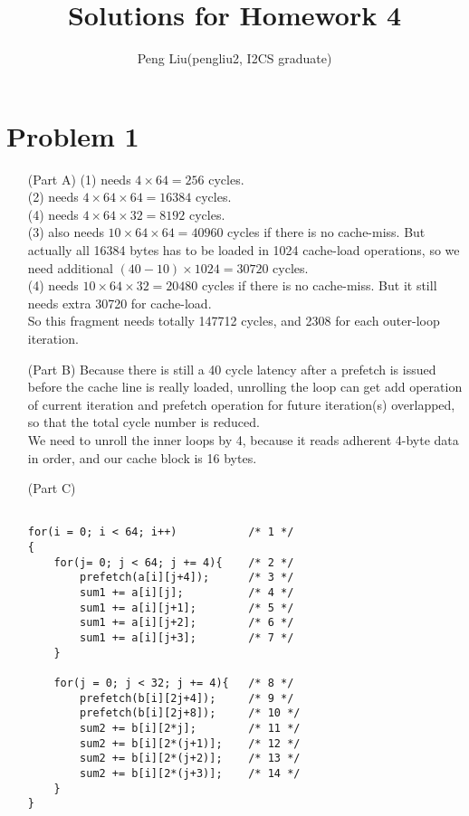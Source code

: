 \documentclass[11pt,leqno]{article}
\author{Peng Liu(pengliu2, I2CS graduate)}
\title{Solutions for Homework 4}
\begin{document}
\lstset{language=C}
\maketitle
\section*{Problem 1}

\begin{enumerate}
\item[(Part A)]
(1) needs $4 \times 64 = 256$ cycles.\\
(2) needs $4 \times 64 \times 64 = 16384$ cycles.\\
(4) needs $4 \times 64 \times 32 = 8192$ cycles.\\
(3) also needs $10 \times 64 \times 64 = 40960$ cycles if there is no cache-miss. But actually all 16384 bytes has to be loaded in 1024 cache-load operations, so we need additional $(40-10) \times 1024 = 30720$ cycles.\\
(4) needs $10 \times 64 \times 32 = 20480$ cycles if there is no cache-miss. But it still needs extra 30720 for cache-load.\\

So this fragment needs totally 147712 cycles, and 2308 for each outer-loop iteration.

\item[(Part B)]
Because there is still a 40 cycle latency after a prefetch is issued before the cache line is really loaded, unrolling the loop can get add operation of current iteration and prefetch operation for future iteration(s) overlapped, so that the total cycle number is reduced.\\
We need to unroll the inner loops by 4, because it reads adherent 4-byte data in order, and our cache block is 16 bytes. 

\item[(Part C)]

\begin{verbatim}

for(i = 0; i < 64; i++)           /* 1 */
{
    for(j= 0; j < 64; j += 4){    /* 2 */
        prefetch(a[i][j+4]);      /* 3 */
        sum1 += a[i][j];          /* 4 */
        sum1 += a[i][j+1];        /* 5 */
        sum1 += a[i][j+2];        /* 6 */
        sum1 += a[i][j+3];        /* 7 */
    }

    for(j = 0; j < 32; j += 4){   /* 8 */
        prefetch(b[i][2j+4]);     /* 9 */
        prefetch(b[i][2j+8]);     /* 10 */
        sum2 += b[i][2*j];        /* 11 */
        sum2 += b[i][2*(j+1)];    /* 12 */
        sum2 += b[i][2*(j+2)];    /* 13 */
        sum2 += b[i][2*(j+3)];    /* 14 */
    }
}


\end{verbatim}
\end{enumerate}
\end{document}
